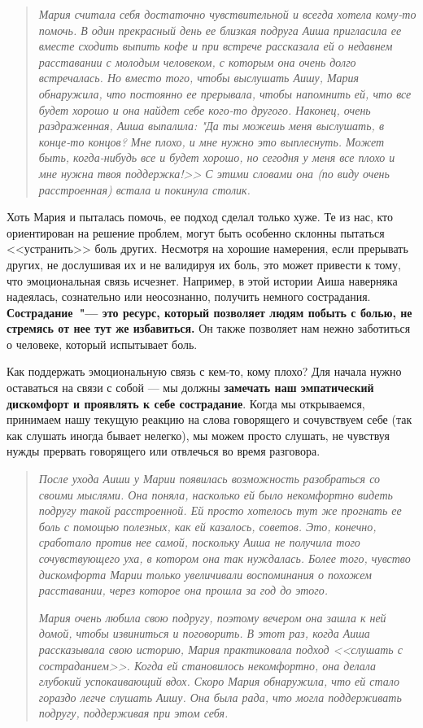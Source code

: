 \begin{quotation}
	\textit{
		Мария считала себя достаточно чувствительной и всегда хотела кому-то помочь. В один прекрасный день ее близкая подруга Аиша пригласила ее вместе сходить выпить кофе и при встрече рассказала ей о недавнем расставании с молодым человеком, с которым она очень долго встречалась. Но вместо того, чтобы выслушать Аишу, Мария обнаружила, что постоянно ее прерывала, чтобы напомнить ей, что все будет хорошо и она найдет себе кого-то другого. Наконец, очень раздраженная, Аиша выпалила: "Да ты можешь меня выслушать, в конце-то концов? Мне плохо, и мне нужно это выплеснуть. Может быть, когда-нибудь все и будет хорошо, но сегодня у меня все плохо и мне нужна твоя поддержка!>> С этими словами она (по виду очень расстроенная) встала и покинула столик.
	}
\end{quotation}

Хоть Мария и пыталась помочь, ее подход сделал только хуже. Те из нас, кто ориентирован на решение проблем, могут быть особенно склонны пытаться <<устранить>> боль других. Несмотря на хорошие намерения, если прерывать других, не дослушивая их и не валидируя их боль, это может привести к тому, что эмоциональная связь исчезнет. Например, в этой истории Аиша наверняка надеялась, сознательно или неосознанно, получить немного сострадания. \textbf{Сострадание~"--- это ресурс, который позволяет людям побыть с болью, не стремясь от нее тут же избавиться.} Он также позволяет нам нежно заботиться о человеке, который испытывает боль.

Как поддержать эмоциональную связь с кем-то, кому плохо? Для начала нужно оставаться на связи с собой — мы должны \textbf{замечать наш эмпатический дискомфорт и проявлять к себе сострадание}. Когда мы открываемся, принимаем нашу текущую реакцию на слова говорящего и сочувствуем себе (так как слушать иногда бывает нелегко), мы можем просто слушать, не чувствуя нужды прервать говорящего или отвлечься во время разговора. 

\begin{quotation}
	\textit{
		После ухода Аиши у Марии появилась возможность разобраться со своими мыслями. Она поняла, насколько ей было некомфортно видеть подругу такой расстроенной. Ей просто хотелось тут же прогнать ее боль с помощью полезных, как ей казалось, советов. Это, конечно, сработало против нее самой, поскольку Аиша не получила того сочувствующего уха, в котором она так нуждалась. Более того, чувство дискомфорта Марии только увеличивали воспоминания о похожем расставании, через которое она прошла за год до этого.
	}
	
	\textit{
		Мария очень любила свою подругу, поэтому вечером она зашла к ней домой, чтобы извиниться и поговорить. В этот раз, когда Аиша рассказывала свою историю, Мария практиковала подход <<слушать с состраданием>>. Когда ей становилось некомфортно, она делала глубокий успокаивающий вдох. Скоро Мария обнаружила, что ей стало гораздо легче слушать Аишу. Она была рада, что могла поддерживать подругу, поддерживая при этом себя.
	} 
\end{quotation}

